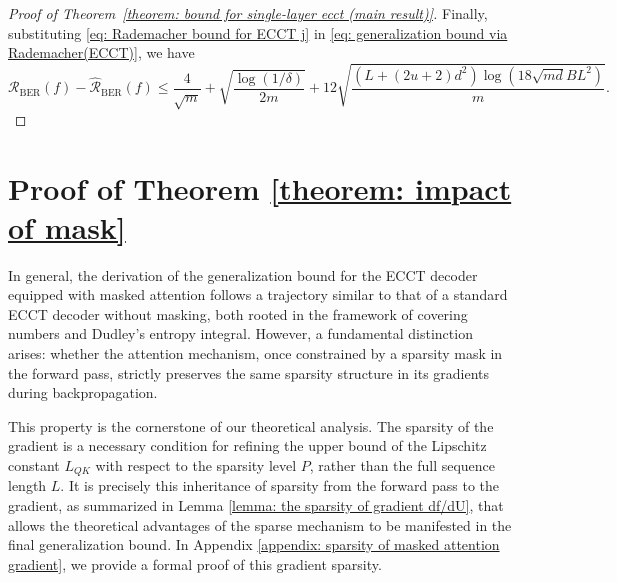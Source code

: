 \documentclass[lettersize,onecolumn]{IEEEtran}
\begin{document}
\begin{proof}[Proof of Theorem~\ref{theorem: bound for single-layer ecct (main result)}]
Finally, substituting \eqref{eq: Rademacher bound for ECCT j} in \eqref{eq: generalization bound via Rademacher(ECCT)}, we have
\begin{equation}
    \mathcal{R}_{\mathrm{BER}}(f)-\hat{\mathcal{R}}_{\mathrm{BER}}(f) \leq \frac{4}{\sqrt{m}}+\sqrt{\frac{\log (1 / \delta)}{2 m}}+12 \sqrt{\frac{(L+(2 u+2) d^{2}) \log (18 \sqrt{m d}B L^{2})}{m}}.
\end{equation}

\end{proof}

\section{Proof of Theorem \ref{theorem: impact of mask}} \label{appendix: proof of impact of mask (theorem2)}

In general, the derivation of the generalization bound for the ECCT decoder equipped with masked attention follows a trajectory similar to that of a standard ECCT decoder without masking, both rooted in the framework of covering numbers and Dudley’s entropy integral. However, a fundamental distinction arises: whether the attention mechanism, once constrained by a sparsity mask in the forward pass, strictly preserves the same sparsity structure in its gradients during backpropagation.

This property is the cornerstone of our theoretical analysis. The sparsity of the gradient is a necessary condition for refining the upper bound of the Lipschitz constant $L_{QK}$ with respect to the sparsity level $P$, rather than the full sequence length $L$. It is precisely this inheritance of sparsity from the forward pass to the gradient, as summarized in Lemma \ref{lemma: the sparsity of gradient df/dU}, that allows the theoretical advantages of the sparse mechanism to be manifested in the final generalization bound. In Appendix \ref{appendix: sparsity of masked attention gradient}, we provide a formal proof of this gradient sparsity.
\end{document}
